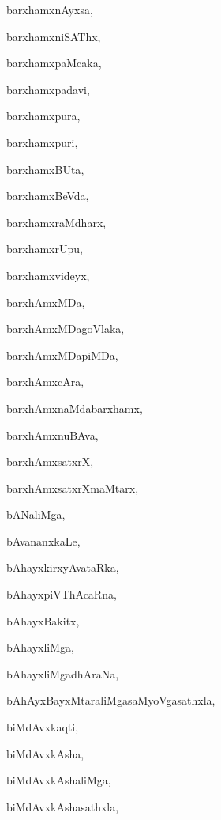 \begin{multicols}{2}
{barxhamxnAyxsa}, \pageref{barxhamxnAyxsa}

{barxhamxniSAThx}, \pageref{barxhamxniSAThx}

{barxhamxpaMcaka}, \pageref{barxhamxpaMcaka}

{barxhamxpadavi}, \pageref{barxhamxpadavi}

{barxhamxpura}, \pageref{barxhamxpura}

{barxhamxpuri}, \pageref{barxhamxpuri}

{barxhamxBUta}, \pageref{barxhamxBUta}

{barxhamxBeVda}, \pageref{barxhamxBeVda}

{barxhamxraMdharx}, \pageref{barxhamxraMdharx}

{barxhamxrUpu}, \pageref{barxhamxrUpu}

{barxhamxvideyx}, \pageref{barxhamxvideyx}

{barxhAmxMDa}, \pageref{barxhAmxMDa}

{barxhAmxMDagoVlaka}, \pageref{barxhAmxMDagoVlaka}

{barxhAmxMDapiMDa}, \pageref{barxhAmxMDapiMDa}

{barxhAmxcAra}, \pageref{barxhAmxcAra}

{barxhAmxnaMdabarxhamx}, \pageref{barxhAmxnaMdabarxhamx}

{barxhAmxnuBAva}, \pageref{barxhAmxnuBAva}

{barxhAmxsatxrX}, \pageref{barxhAmxsatxrX}

{barxhAmxsatxrXmaMtarx}, \pageref{barxhAmxsatxrXmaMtarx}

{bANaliMga}, \pageref{bANaliMga}

{bAvananxkaLe}, \pageref{bAvananxkaLe}

{bAhayxkirxyAvataRka}, \pageref{bAhayxkirxyAvataRka}

{bAhayxpiVThAcaRna}, \pageref{bAhayxpiVThAcaRna}

{bAhayxBakitx}, \pageref{bAhayxBakitx}

{bAhayxliMga}, \pageref{bAhayxliMga}

{bAhayxliMgadhAraNa}, \pageref{bAhayxliMgadhAraNa}

{bAhAyxBayxMtaraliMgasaMyoVgasathxla}, \pageref{bAhAyxBayxMtaraliMgasaMyoVgasathxla}

{biMdAvxkaqti}, \pageref{biMdAvxkaqti}

{biMdAvxkAsha}, \pageref{biMdAvxkAsha}

{biMdAvxkAshaliMga}, \pageref{biMdAvxkAshaliMga}

{biMdAvxkAshasathxla}, \pageref{biMdAvxkAshasathxla}


\end{multicols}
